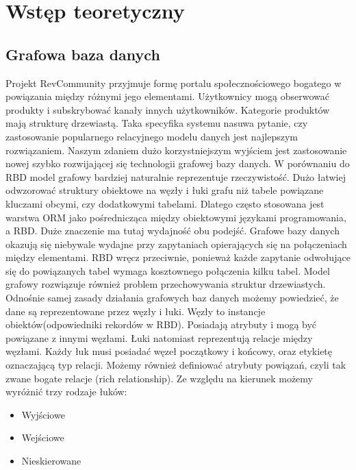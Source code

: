 \chapter{Wstęp teoretyczny}

\section{Grafowa baza danych}

Projekt RevCommunity przyjmuje formę portalu społecznościowego bogatego w powiązania między różnymi jego elementami. Użytkownicy mogą obserwować produkty i subskrybować kanały innych użytkowników. Kategorie produktów mają strukturę drzewiastą. Taka specyfika systemu nasuwa pytanie, czy zastosowanie popularnego relacyjnego modelu danych jest najlepszym rozwiązaniem. Naszym zdaniem dużo korzystniejszym wyjściem jest zastosowanie nowej szybko rozwijającej się technologii grafowej bazy danych. W porównaniu do RBD model grafowy bardziej naturalnie reprezentuje rzeczywistość. Dużo łatwiej odwzorować struktury obiektowe na węzły i łuki grafu niż tabele powiązane kluczami obcymi, czy dodatkowymi tabelami. Dlatego często stosowana jest warstwa ORM jako pośrednicząca między obiektowymi językami programowania, a RBD. Duże znaczenie ma tutaj wydajność obu podejść. Grafowe bazy danych okazują się niebywale wydajne przy zapytaniach opierających się na połączeniach między elementami. RBD wręcz przeciwnie, ponieważ każde zapytanie odwołujące się do powiązanych tabel wymaga kosztownego połączenia kilku tabel. Model grafowy rozwiązuje również problem przechowywania struktur drzewiastych.
Odnośnie samej zasady działania grafowych baz danych możemy powiedzieć, że dane są reprezentowane przez węzły i łuki. Węzły to instancje obiektów(odpowiedniki rekordów w RBD). Posiadają atrybuty i mogą być powiązane z innymi węzłami. Łuki natomiast reprezentują relacje między węzłami. Każdy łuk musi posiadać węzeł początkowy i końcowy, oraz etykietę oznaczającą typ relacji. Możemy również definiować atrybuty powiązań, czyli tak zwane bogate relacje (rich relationship). Ze względu na kierunek możemy wyróżnić trzy rodzaje łuków:
\begin{itemize}
\item Wyjściowe
\item Wejściowe
\item Nieskierowane
\end{itemize}


